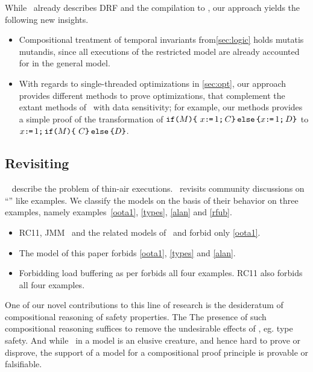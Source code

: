 While~\citet{Dolan:2018:BDR:3192366.3192421} already describes DRF and  the compilation to \armeight, our approach yields the following new insights.
\begin{itemize}
\item Compositional treatment of temporal invariants from\textsection\ref{sec:logic} holds mutatis mutandis, since all executions of the restricted model are already accounted for in the general model.

\item With regards to single-threaded optimizations in \textsection\ref{sec:opt}, our approach provides different methods to prove optimizations, that complement the extant methods of~\citet{Dolan:2018:BDR:3192366.3192421} with data sensitivity; for example, our methods provides a simple proof of  the transformation of $
\texttt{if}\allowbreak\texttt{(}M\texttt{)}\allowbreak\texttt{\{}\ x \texttt{:}\mkern-1mu\texttt{=}\, 1 \texttt{;}\, C \texttt{\}}\,\allowbreak\texttt{else}\allowbreak\,\texttt{\{} x\texttt{:}\mkern-1mu\texttt{=}\, 1 \texttt{;}\, D\texttt{\}}$ to 
$x \texttt{:}\mkern-1mu\texttt{=}\, 1 \texttt{;}\, \texttt{if}\allowbreak\texttt{(}M\texttt{)}\allowbreak\texttt{\{}\  C \texttt{\}}\,\allowbreak\texttt{else}\allowbreak\,\texttt{\{}  D\texttt{\}}$.

\end{itemize}

\subsection{Revisiting \oota}
~\citet{DBLP:conf/esop/BattyMNPS15} describe the problem of thin-air executions.~\citet{BoehmOOTA} revisits community discussions on ``\oota'' like examples.  We classify the models on the basis of their behavior on three examples, namely examples~\eqref{oota1}, \eqref{types}, \eqref{alan} and \eqref{rfub}.  
\begin{itemize}
\item RC11\cite{DBLP:conf/pldi/LahavVKHD17}, JMM~\cite{Manson:2005:JMM:1047659.1040336} and the related models of~\citet{DBLP:conf/esop/JagadeesanPR10} and \citet{DBLP:conf/popl/KangHLVD17} forbid only \eqref{oota1}.
\item The model of this paper forbids \eqref{oota1}, \eqref{types} and \eqref{alan}.
\item Forbidding load buffering as per \citep{Dolan:2018:BDR:3192366.3192421,BoehmOOTA} forbids all four examples.  RC11\cite{DBLP:conf/pldi/LahavVKHD17} also forbids all four examples. 
\end{itemize}

One of our novel contributions to this line of research is the desideratum of compositional reasoning of safety properties. The The presence of such compositional reasoning suffices to remove the undesirable effects of \oota, eg. type safety.  And while \oota\ in a model is an elusive creature, and hence hard to prove or disprove,  the support of a model for a compositional proof principle is provable or falsifiable.  

